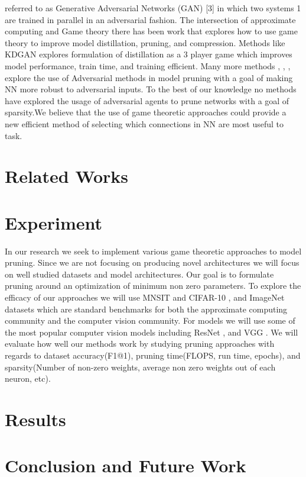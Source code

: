 \documentclass{article}
\begin{document}
referred to as Generative Adversarial Networks (GAN) [3] in which two systems
1
are trained in parallel in an adversarial fashion. The intersection of approximate computing and Game theory there has been work that explores how to use
game theory to improve model distillation, pruning, and compression. Methods
like KDGAN \cite{Wang2018KDGANKD} explores formulation of distillation as a 3 player game which
improves model performance, train time, and training efficient. Many more
methods \cite{Guo2018SparseDW} \cite{Dhillon2018StochasticAP}, \cite{Sehwag2020OnPA}, \cite{Xie2020BlindAP}, explore the use of Adversarial methods in model
pruning with a goal of making NN more robust to adversarial inputs. To the best
of our knowledge no methods have explored the usage of adversarial agents to
prune networks with a goal of sparsity.We believe that the use of game theoretic
approaches could provide a new efficient method of selecting which connections
in NN are most useful to task.
\section{Related Works}
\section{Experiment}
In our research we seek to implement various game theoretic approaches to
model pruning. Since we are not focusing on producing novel architectures we
will focus on well studied datasets and model architectures. Our goal is to formulate pruning around an optimization of minimum non zero parameters. To
explore the efficacy of our approaches we will use MNSIT \cite{lecun-mnisthandwrittendigit-2010} and CIFAR-10 \cite{CIFAR-10}
, and ImageNet \cite{Russakovsky2015ImageNetLS} datasets which are standard benchmarks for both the
approximate computing community and the computer vision community. For
models we will use some of the most popular computer vision models including
ResNet \cite{He2016DeepRL}, and VGG \cite{Simonyan2015VeryDC}. We will evaluate how well our methods work by studying pruning approaches with regards to dataset accuracy(F1@1), pruning time(FLOPS, run time, epochs), and sparsity(Number of non-zero weights, average non zero weights out of each neuron, etc).
\section{Results}
\section{Conclusion and Future Work}
\end{document}
